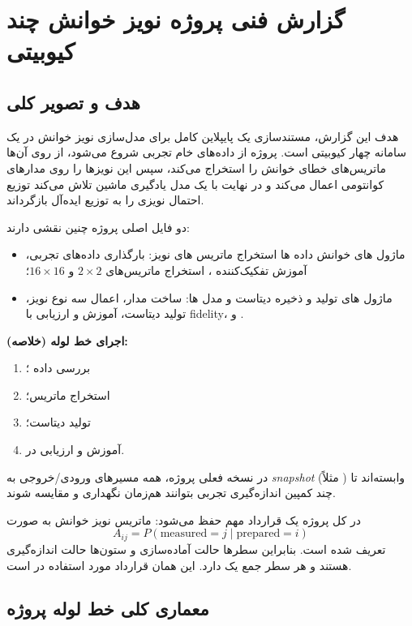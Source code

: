 \chapter*{گزارش فنی پروژه نویز خوانش چند کیوبیتی}

\section*{هدف و تصویر کلی}

هدف این گزارش، مستندسازی یک پایپلاین کامل برای مدل‌سازی نویز خوانش در یک سامانه چهار کیوبیتی است. پروژه از داده‌های خام تجربی  شروع می‌شود، از روی آن‌ها ماتریس‌های خطای خوانش را استخراج می‌کند، سپس این نویزها را روی مدارهای کوانتومی اعمال می‌کند و در نهایت با یک مدل یادگیری ماشین تلاش می‌کند توزیع احتمال نویزی را به توزیع ایده‌آل بازگرداند.

دو فایل اصلی پروژه چنین نقشی دارند:
\begin{itemize}
	\item ماژول های خوانش داده ها  استخراج ماتریس های نویز: بارگذاری داده‌های تجربی، آموزش تفکیک‌کننده ، استخراج ماتریس‌های $2\times2$ و $16\times16$؛
	\item ماژول های تولید و ذخیره دیتاست و مدل ها: ساخت مدار، اعمال سه نوع نویز، تولید دیتاست، آموزش  و ارزیابی با fidelity،  و .
\end{itemize}

\textbf{اجرای خط لوله (خلاصه):}
\begin{enumerate}
	\item بررسی داده  ؛
	\item استخراج ماتریس؛
	\item تولید دیتاست؛
	\item آموزش و ارزیابی در.
\end{enumerate}

در نسخه فعلی پروژه، همه مسیرهای ورودی/خروجی به \emph{snapshot} (مثلاً ) وابسته‌اند تا چند کمپین اندازه‌گیری تجربی بتوانند هم‌زمان نگهداری و مقایسه شوند.

در کل پروژه یک قرارداد مهم حفظ می‌شود: ماتریس نویز خوانش به صورت
\begin{equation}
	A_{ij}=P(\text{measured}=j \mid \text{prepared}=i)
	\label{eq:assignment-convention}
\end{equation}
تعریف شده است. بنابراین سطرها حالت آماده‌سازی و ستون‌ها حالت اندازه‌گیری هستند و هر سطر جمع یک دارد. این همان قرارداد مورد استفاده در  است.

\section*{معماری کلی خط لوله پروژه}

